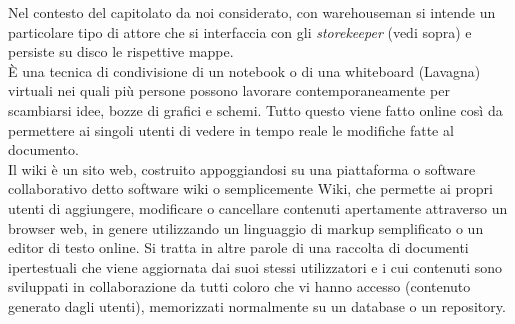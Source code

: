 \documentclass{scalatekids-article}
\begin{document}
   Nel contesto del capitolato da noi considerato, con warehouseman si intende un particolare tipo di attore che si interfaccia con gli \textit{storekeeper} (vedi sopra) e persiste su disco le rispettive mappe.
  \\

   È una tecnica di condivisione di un notebook o di una whiteboard (Lavagna) virtuali nei quali più persone possono lavorare contemporaneamente per scambiarsi idee, bozze di grafici e schemi.
  Tutto questo viene fatto online così da permettere ai singoli utenti di vedere in tempo reale le modifiche fatte al documento.
  \\

   Il wiki è un sito web, costruito appoggiandosi su una piattaforma o software collaborativo detto software wiki o semplicemente Wiki, che permette ai propri utenti di aggiungere, modificare o cancellare contenuti apertamente attraverso un browser web, in genere utilizzando un linguaggio di markup semplificato o un editor di testo online.
  Si tratta in altre parole di una raccolta di documenti ipertestuali che viene aggiornata dai suoi stessi utilizzatori e i cui contenuti sono sviluppati in collaborazione da tutti coloro che vi hanno accesso (contenuto generato dagli utenti), memorizzati normalmente su un database o un repository.
  \\



\end{document}
